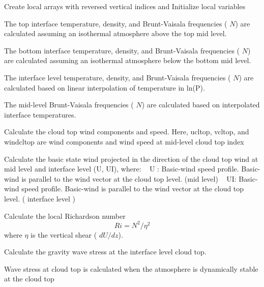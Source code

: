 \begin{DoxyEnumerate}
\item Create local arrays with reversed vertical indices and Initialize local variables
\begin{DoxyItemize}
\item The top interface temperature, density, and Brunt-\/\+Vaisala frequencies ( $N$) are calculated assuming an isothermal atmosphere above the top mid level.
\item The bottom interface temperature, density, and Brunt-\/\+Vaisala frequencies ( $N$) are calculated assuming an isothermal atmosphere below the bottom mid level.
\item The interface level temperature, density, and Brunt-\/\+Vaisala frequencies ( $N$) are calculated based on linear interpolation of temperature in ln(\+P).
\item The mid-\/level Brunt-\/\+Vaisala frequencies ( $N$) are calculated based on interpolated interface temperatures.
\end{DoxyItemize}
\item Calculate the cloud top wind components and speed. Here, ucltop, vcltop, and windcltop are wind components and wind speed at mid-\/level cloud top index
\item Calculate the basic state wind projected in the direction of the cloud top wind at mid level and interface level (U, UI), where\+: ~\newline
 U \+: Basic-\/wind speed profile. Basic-\/wind is parallel to the wind vector at the cloud top level. (mid level) ~\newline
 UI\+: Basic-\/wind speed profile. Basic-\/wind is parallel to the wind vector at the cloud top level. ( interface level )
\item Calculate the local Richardson number \[ Ri=N^2/\eta^2 \] where $\eta$ is the vertical shear ( $dU/dz$).
\item Calculate the gravity wave stress at the interface level cloud top.
\begin{DoxyItemize}
\item Wave stress at cloud top is calculated when the atmosphere is dynamically stable at the cloud top

\end{DoxyItemize}
\end{DoxyEnumerate}
